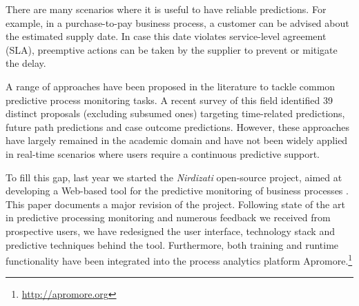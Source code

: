 \documentclass[runningheads,a4paper]{llncs}
\begin{document}
There are many scenarios where it is useful to have reliable predictions. For example, in a purchase-to-pay business process, a customer can be advised about the estimated supply date. In case this date violates service-level agreement (SLA), preemptive actions can be taken by the supplier to prevent or mitigate the delay.

A range of approaches have been proposed in the literature to tackle common predictive process monitoring tasks. A recent survey of this field \cite{Chamorro2017} identified 39 distinct proposals (excluding subsumed ones) targeting time-related predictions, future path predictions and case outcome predictions.
However, these approaches have largely remained in the academic domain and have not been widely applied in real-time scenarios where users require a continuous predictive support.

To fill this gap, last year we started the \emph{Nirdizati} open-source project, aimed at developing a Web-based tool for the predictive monitoring of business processes \cite{Jorbina2017}. This paper documents a major revision of the project. Following state of the art in predictive processing monitoring and numerous feedback we received from prospective users, we have redesigned the user interface, technology stack and predictive techniques behind the tool. Furthermore, both training and runtime functionality have been integrated into the process analytics platform Apromore.\footnote{\url{http://apromore.org}}

\end{document}
